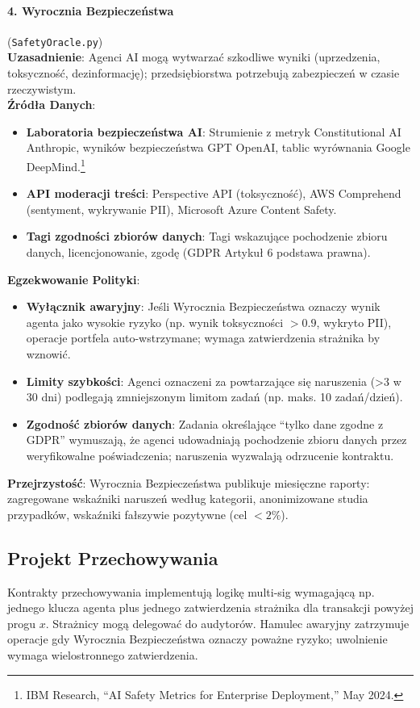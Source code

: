 \documentclass[11pt]{article}
\begin{document}
\paragraph{4. Wyrocznia Bezpieczeństwa} (\texttt{SafetyOracle.py})\\
\textbf{Uzasadnienie}: Agenci AI mogą wytwarzać szkodliwe wyniki (uprzedzenia, toksyczność, dezinformację); przedsiębiorstwa potrzebują zabezpieczeń w czasie rzeczywistym.\\
\textbf{Źródła Danych}:
\begin{itemize}[noitemsep]
  \item \textbf{Laboratoria bezpieczeństwa AI}: Strumienie z metryk Constitutional AI Anthropic, wyników bezpieczeństwa GPT OpenAI, tablic wyrównania Google DeepMind.\footnote{IBM Research, ``AI Safety Metrics for Enterprise Deployment,'' May 2024.}
  \item \textbf{API moderacji treści}: Perspective API (toksyczność), AWS Comprehend (sentyment, wykrywanie PII), Microsoft Azure Content Safety.
  \item \textbf{Tagi zgodności zbiorów danych}: Tagi wskazujące pochodzenie zbioru danych, licencjonowanie, zgodę (GDPR Artykuł 6 podstawa prawna).
\end{itemize}
\textbf{Egzekwowanie Polityki}:
\begin{itemize}[noitemsep]
  \item \textbf{Wyłącznik awaryjny}: Jeśli Wyrocznia Bezpieczeństwa oznaczy wynik agenta jako wysokie ryzyko (np. wynik toksyczności $>0.9$, wykryto PII), operacje portfela auto-wstrzymane; wymaga zatwierdzenia strażnika by wznowić.
  \item \textbf{Limity szybkości}: Agenci oznaczeni za powtarzające się naruszenia (>3 w 30 dni) podlegają zmniejszonym limitom zadań (np. maks. 10 zadań/dzień).
  \item \textbf{Zgodność zbiorów danych}: Zadania określające ``tylko dane zgodne z GDPR'' wymuszają, że agenci udowadniają pochodzenie zbioru danych przez weryfikowalne poświadczenia; naruszenia wyzwalają odrzucenie kontraktu.
\end{itemize}
\textbf{Przejrzystość}: Wyrocznia Bezpieczeństwa publikuje miesięczne raporty: zagregowane wskaźniki naruszeń według kategorii, anonimizowane studia przypadków, wskaźniki fałszywie pozytywne (cel $<2\%$).

\subsection{Projekt Przechowywania}
Kontrakty przechowywania implementują logikę multi-sig wymagającą np. jednego klucza agenta plus jednego zatwierdzenia strażnika dla transakcji powyżej progu $x$. Strażnicy mogą delegować do audytorów. Hamulec awaryjny zatrzymuje operacje gdy Wyrocznia Bezpieczeństwa oznaczy poważne ryzyko; uwolnienie wymaga wielostronnego zatwierdzenia.
\end{document}
